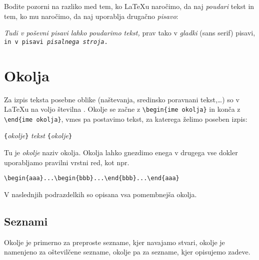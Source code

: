 Bodite pozorni na razliko med tem, ko \LaTeX{}u naročimo, da naj \emph{poudari} tekst in
tem, ko mu naročimo, da naj uporablja drugačno \emph{pisavo}:

\begin{example}
\textit{Tudi v poševni pisavi
  lahko \emph{poudarimo} tekst,} 
\textsf{prav tako v \emph{gladki}
  (sans serif) pisavi,}
\texttt{in v pisavi 
  \emph{pisalnega stroja}.}
\end{example}

\section{Okolja} \label{env}

Za izpis teksta posebne oblike (naštevanja, sredinsko poravnani tekst,\ldots) so v  
\LaTeX{}u na voljo številna . Okolje se začne z
\verb|\begin{ime okolja}| in konča z \verb|\end{ime okolja}|, vmes pa postavimo 
tekst, za katerega želimo poseben izpis:
\begin{lscommand}
\verb|{|\emph{okolje}\verb|}|\quad
   \emph{tekst}\quad
{}\verb|{|\emph{okolje}\verb|}|
\end{lscommand}
\noindent Tu je \emph{okolje} naziv okolja. Okolja lahko gnezdimo enega v drugega vse dokler 
uporabljamo pravilni vrstni red, kot npr.
\begin{code}
\verb|\begin{aaa}...\begin{bbb}...\end{bbb}...\end{aaa}|
\end{code}

\noindent V naslednjih podrazdelkih so opisana vsa pomembnejša okolja.

\subsection{Seznami}

Okolje  je primerno za preproste sezname, kjer navajamo stvari, okolje 
 je namenjeno za oštevilčene sezname, okolje 
 pa za sezname, kjer opisujemo zadeve.

